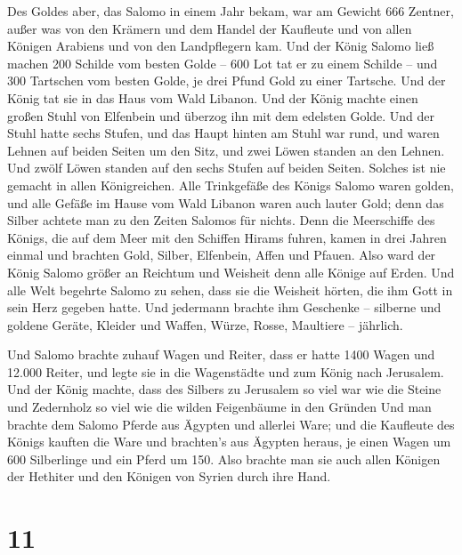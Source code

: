  Des Goldes aber, das Salomo in einem Jahr bekam, war am
Gewicht 666 Zentner,  außer was von den Krämern und dem
Handel der Kaufleute und von allen Königen Arabiens und von den
Landpflegern kam.  Und der König Salomo ließ machen 200
Schilde vom besten Golde -- 600 Lot tat er zu einem Schilde --
 und 300 Tartschen vom besten Golde, je drei Pfund Gold
zu einer Tartsche. Und der König tat sie in das Haus vom Wald Libanon.
 Und der König machte einen großen Stuhl von Elfenbein
und überzog ihn mit dem edelsten Golde.  Und der Stuhl
hatte sechs Stufen, und das Haupt hinten am Stuhl war rund, und waren
Lehnen auf beiden Seiten um den Sitz, und zwei Löwen standen an den
Lehnen.  Und zwölf Löwen standen auf den sechs Stufen auf
beiden Seiten. Solches ist nie gemacht in allen Königreichen.
 Alle Trinkgefäße des Königs Salomo waren golden, und
alle Gefäße im Hause vom Wald Libanon waren auch lauter Gold; denn das
Silber achtete man zu den Zeiten Salomos für nichts. 
Denn die Meerschiffe des Königs, die auf dem Meer mit den Schiffen
Hirams fuhren, kamen in drei Jahren einmal und brachten Gold, Silber,
Elfenbein, Affen und Pfauen.  Also ward der König Salomo
größer an Reichtum und Weisheit denn alle Könige auf Erden.
 Und alle Welt begehrte Salomo zu sehen, dass sie die
Weisheit hörten, die ihm Gott in sein Herz gegeben hatte.
 Und jedermann brachte ihm Geschenke -- silberne und
goldene Geräte, Kleider und Waffen, Würze, Rosse, Maultiere -- jährlich.

 Und Salomo brachte zuhauf Wagen und Reiter, dass er
hatte 1400 Wagen und 12.000 Reiter, und legte sie in die Wagenstädte und
zum König nach Jerusalem.  Und der König machte, dass des
Silbers zu Jerusalem so viel war wie die Steine und Zedernholz so viel
wie die wilden Feigenbäume in den Gründen  Und man
brachte dem Salomo Pferde aus Ägypten und allerlei Ware; und die
Kaufleute des Königs kauften die Ware  und brachten's aus
Ägypten heraus, je einen Wagen um 600 Silberlinge und ein Pferd um 150.
Also brachte man sie auch allen Königen der Hethiter und den Königen von
Syrien durch ihre Hand.

\hypertarget{section-10}{%
\section{11}\label{section-10}}

